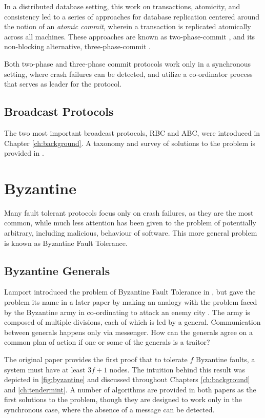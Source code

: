 In a distributed database setting, this work on transactions, atomicity, and consistency
led to a series of approaches for database replication centered around the notion of an \emph{atomic commit},
wherein a transaction is replicated atomically across all machines.
These approaches are known as two-phase-commit \cite{gray1978notes}, and its non-blocking alternative,
three-phase-commit \cite{skeen1983formal}.

Both two-phase and three-phase commit protocols work only in a synchronous setting,
where crash failures can be detected, and utilize a co-ordinator process that serves as leader for the protocol.

\subsection{Broadcast Protocols}

The two most important broadcast protocols, RBC and ABC, were introduced in Chapter \ref{ch:background}.
A taxonomy and survey of solutions to the problem is provided in \cite{defago2004total}.

\section{Byzantine}
Many fault tolerant protocols focus only on crash failures, as they are the most common,
while much less attention has been given to the problem of potentially arbitrary, including malicious,
behaviour of software. This more general problem is known as Byzantine Fault Tolerance.

\subsection{Byzantine Generals}

Lamport introduced the problem of Byzantine Fault Tolerance in \cite{pease1980reaching},
but gave the problem its name in a later paper by making an analogy with the problem faced
by the Byzantine army in co-ordinating to attack an enemy city \cite{lamport1982byzantine}.
The army is composed of multiple divisions, each of which is led by a general.
Communication between generals happens only via messenger.
How can the generals agree on a common plan of action if one or some of the generals is a traitor?

The original paper provides the first proof that to tolerate $f$ Byzantine faults,
a system must have at least $3f+1$ nodes. 
The intuition behind this result was depicted in \ref{fig:byzantine} and discussed 
throughout Chapters \ref{ch:background} and \ref{ch:tendermint}.
A number of algorithms are provided in both papers as the first solutions to the problem,
though they are designed to work only in the synchronous case, where the absence of a message can be detected.

